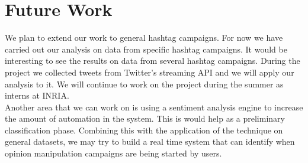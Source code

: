 \documentclass[journal, a4paper, 12pt]{article}
\begin{document}
\section{Future Work}

We plan to extend our work to general hashtag campaigns. For now we have carried out our analysis on data from specific hashtag campaigns. It would be interesting to see the results on data from several hashtag campaigns. During the project we collected tweets from Twitter's streaming API and we will apply our analysis to it. We will continue to work on the project during the summer as interns at INRIA. \\

Another area that we can work on is using a sentiment analysis engine to increase the amount of automation in the system. This is would help as a preliminary classification phase. Combining this with the application of the technique on general datasets, we may try to build a real time system that can identify when opinion manipulation campaigns are being started by users.
\\
\vspace*{\fill}
\pagebreak
\end{document}
